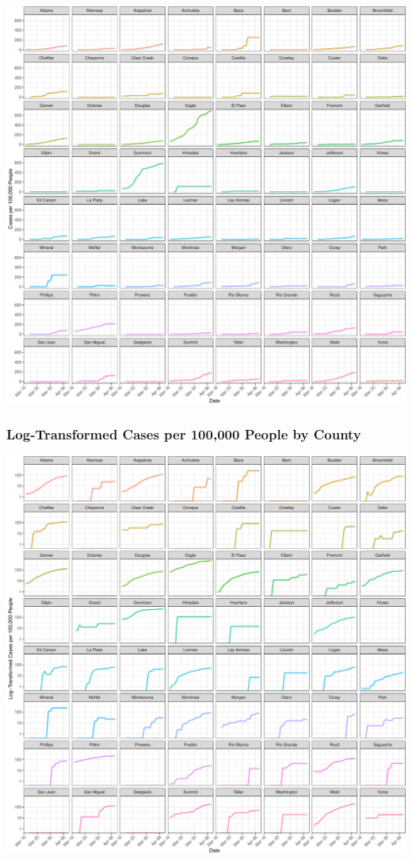 \documentclass[]{article}
\begin{document}
\includegraphics{figs/daily-cases-100k-1.pdf}

\hypertarget{log-transformed-cases-per-100000-people-by-county}{%
\subsubsection{Log-Transformed Cases per 100,000 People by
County}\label{log-transformed-cases-per-100000-people-by-county}}

\includegraphics{figs/daily-cases-100k-log-1.pdf}
\end{document}
